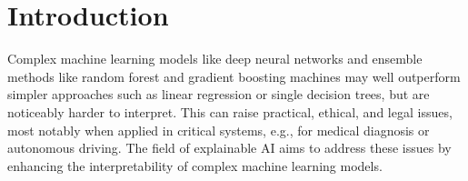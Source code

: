 \documentclass{article}
\begin{document}
%






%


\section{Introduction}

Complex machine learning models like deep neural networks and ensemble methods like random forest and gradient boosting machines may well outperform simpler approaches such as linear regression or single decision trees, but are noticeably harder to interpret. This can raise practical, ethical, and legal issues, most notably when applied in critical systems, e.g., for medical diagnosis or autonomous driving. The field of explainable AI aims to address these issues by enhancing the interpretability of complex machine learning models.
\end{document}
